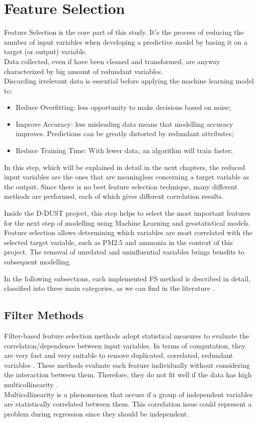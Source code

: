 \section{Feature Selection}
Feature Selection is the core part of this study. It's the process of reducing the number of input variables when developing a predictive model by basing it on a target (or output) variable. \\
Data collected, even if have been cleaned and transformed, are anyway characterized by big amount of redundant variables.\\
Discarding irrelevant data is essential before applying the machine learning model to:
\begin{itemize}
\item Reduce Overfitting: less opportunity to make decisions based on noise;
\item Improve Accuracy: less misleading data means that modelling accuracy improves. Predictions can be greatly distorted by redundant attributes;
\item Reduce Training Time: With fewer data, an algorithm will train faster;
\end{itemize}
In this step, which will be explained in detail in the next chapters, the reduced input variables are the ones that are meaningless concerning a target variable as the output. \newline
Since there is no best feature selection technique, many different methods are performed, each of which gives different correlation results.\par
Inside the D-DUST project, this step helps to select the most important features for the next step of modelling using Machine Learning and geostatistical models. \\
Feature selection allows determining which variables are most correlated with the selected target variable, such as PM2.5 and ammonia in the context of this project. 
The removal of unrelated and uninfluential variables brings benefits to subsequent modelling.
\par
In the following subsections, each implemented FS method is described in detail, classified into three main categories, as we can find in the literature \cite{stanczyk2015feature}.
\subsection{Filter Methods}
Filter-based feature selection methods adopt statistical measures to evaluate the correlation/dependence between input variables.\newline
In terms of computation, they are very fast and very suitable to remove duplicated, correlated, redundant variables \cite{saeys2007review}. \newline
These methods evaluate each feature individually without considering the interaction between them. Therefore, they do not fit well if the data has high multicollinearity \cite{daoud2017multicollinearity}.\\
Multicollinearity is a phenomenon that occurs if a group of independent variables are statistically correlated between them. 
This correlation issue could represent a problem during regression since they should be independent. 
